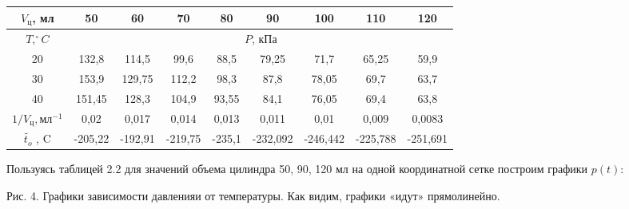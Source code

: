 \documentclass[12pt]{article}
\begin{document}
\begin{enumerate}
\begin{table}[h!]
\begin{center}
\begin{tabular}{|c|c|c|c|c|c|c|c|c|}
\hline
$V_{ц}$, мл	&50&	60	&70&	80&	90	&100&	110&	120\\
\hline
$T, ^{\circ}C	$&\multicolumn{8}{|c|}{$P$, кПа}\\
\hline
20&	132,8&	114,5&	99,6&	88,5	&       79,25	&71,7	&65,25&	59,9\\
\hline
30	&153,9&	129,75&	112,2&	98,3&	87,8&	78,05&	69,7&	63,7\\
\hline
40	&151,45	&128,3&	104,9&	93,55&	84,1	&       76,05&	69,4&	63,8\\
\hline
$1/V_{ц}, мл^{-1}$ &0,02	&0,017&	0,014&	0,013&	0,011	&0,01&	0,009&	0,0083\\
\hline
$\widetilde{t_{o}}$ , C&	-205,22&	-192,91&	-219,75	&-235,1&	-232,092&	-246,442	&-225,788	&-251,691\\
\hline
\end{tabular}
\end{center}
\end{table} 
\newpage
Пользуясь таблицей 2.2 для значений объема цилиндра 50, 90, 120 мл на одной координатной сетке построим графики $p(t)$:
\par\bigskip\par\bigskip\par\bigskip\par\bigskip\par\bigskip\par\bigskip\par\bigskip\par\bigskip\par\bigskip\par\bigskip\par\bigskip\par\bigskip\par\bigskip\par\bigskip\par\bigskip\par\bigskip\par\bigskip\par\bigskip\par\bigskip\par\bigskip\par\bigskip\par\bigskip\par\bigskip\par\bigskip\par\bigskip\par\bigskip\par\bigskip\par\bigskip 
Рис. 4. Графики зависимости давленияи от температуры. Как видим, графики «идут» прямолинейно.



\end{enumerate}
\end{document}
